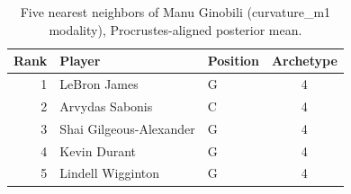 \begin{table}[htbp]
  \centering\small
  \begin{tabular}{rllc}
    \toprule
    Rank & Player & Position & Archetype \\
    \midrule
    1 & LeBron James & G & 4 \\
    2 & Arvydas Sabonis & C & 4 \\
    3 & Shai Gilgeous-Alexander & G & 4 \\
    4 & Kevin Durant & G & 4 \\
    5 & Lindell Wigginton & G & 4 \\
    \bottomrule
  \end{tabular}
  \caption{Five nearest neighbors of Manu Ginobili (curvature_m1 modality), Procrustes-aligned posterior mean.}
  \label{tab:Manu_Ginobili_neighbors_curvature_m1}
\end{table}

